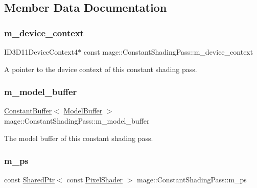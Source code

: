 \subsection{Member Data Documentation}
\hypertarget{classmage_1_1_constant_shading_pass_a34769eb874a24f75c1d9ed8a6610eddc}{}\label{classmage_1_1_constant_shading_pass_a34769eb874a24f75c1d9ed8a6610eddc} 
\subsubsection{\texorpdfstring{m\+\_\+device\+\_\+context}{m\_device\_context}}
{\footnotesize\ttfamily I\+D3\+D11\+Device\+Context4$\ast$ const mage\+::\+Constant\+Shading\+Pass\+::m\+\_\+device\+\_\+context\hspace{0.3cm}{\ttfamily [private]}}

A pointer to the device context of this constant shading pass. \hypertarget{classmage_1_1_constant_shading_pass_ae828b9ae1e4cd281f346aca0db34c015}{}\label{classmage_1_1_constant_shading_pass_ae828b9ae1e4cd281f346aca0db34c015} 
\subsubsection{\texorpdfstring{m\+\_\+model\+\_\+buffer}{m\_model\_buffer}}
{\footnotesize\ttfamily \hyperlink{structmage_1_1_constant_buffer}{Constant\+Buffer}$<$ \hyperlink{structmage_1_1_model_buffer}{Model\+Buffer} $>$ mage\+::\+Constant\+Shading\+Pass\+::m\+\_\+model\+\_\+buffer\hspace{0.3cm}{\ttfamily [private]}}

The model buffer of this constant shading pass. \hypertarget{classmage_1_1_constant_shading_pass_a719c0a1d8de1fe80ab79667f3daaa3b0}{}\label{classmage_1_1_constant_shading_pass_a719c0a1d8de1fe80ab79667f3daaa3b0} 
\subsubsection{\texorpdfstring{m\+\_\+ps}{m\_ps}}
{\footnotesize\ttfamily const \hyperlink{namespacemage_a1e01ae66713838a7a67d30e44c67703e}{Shared\+Ptr}$<$ const \hyperlink{namespacemage_a27ecaf266420ee7a494d64edc0757129}{Pixel\+Shader} $>$ mage\+::\+Constant\+Shading\+Pass\+::m\+\_\+ps\hspace{0.3cm}{\ttfamily [private]}}

